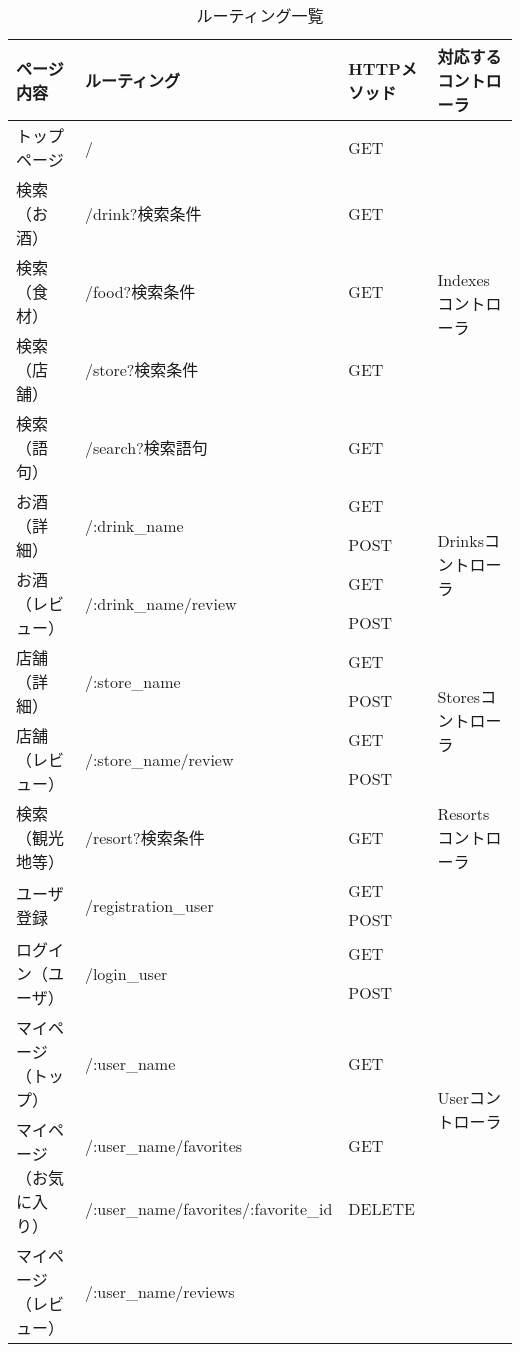 \documentclass[a4j,titlepage]{jarticle}
\begin{document}
\begin{description}
\begin{table}[!htbp]
\caption{ルーティング一覧}
\label{routing}
\small
\begin{center}
\begin{tabular}{|l|l|l|p{4cm}|}\hline
ページ内容 & ルーティング & HTTPメソッド & 対応するコントローラ\\\hline\hline
トップページ & / & GET & \multirow{5}{*}{Indexesコントローラ} \\\cline{1-3}
検索（お酒） & /drink?検索条件 & GET & \\\cline{1-3}
検索（食材） & /food?検索条件 & GET & \\\cline{1-3}
検索（店舗） & /store?検索条件 & GET &  \\\cline{1-3}
検索（語句） & /search?検索語句 & GET & \\\hline
\multirow{2}{*}{お酒（詳細）} & \multirow{2}{*}{/:drink\_name}
& GET & \multirow{4}{*}{Drinksコントローラ} \\\cline{3-3}
 & & POST &  \\\cline{1-3}
\multirow{2}{*}{お酒（レビュー）} & \multirow{2}{*}{/:drink\_name/review}
& GET & \\\cline{3-3}
 & & POST & \\\hline
\multirow{2}{*}{店舗（詳細）} & \multirow{2}{*}{/:store\_name}
& GET & \multirow{4}{*}{Storesコントローラ} \\\cline{3-3}
 & & POST &  \\\cline{1-3}
\multirow{2}{*}{店舗（レビュー）}& \multirow{2}{*}{/:store\_name/review}
& GET &  \\\cline{3-3}
 & & POST &\\\hline
検索（観光地等） & /resort?検索条件 & GET & Resortsコントローラ \\\hline
\multirow{2}{*}{ユーザ登録} & \multirow{2}{*}{/registration\_user}
& GET & \multirow{12}{*}{Userコントローラ} \\\cline{3-3}
 & & POST & \\\cline{1-3}
 \multirow{2}{*}{ログイン（ユーザ）} & \multirow{2}{*}{/login\_user}
 & GET & \\\cline{3-3}
 & & POST & \\\cline{1-3}
マイページ（トップ） & /:user\_name
& GET & \\\cline{1-3}
\multirow{2}{*}{マイページ（お気に入り）} & /:user\_name/favorites
& GET & \\\cline{2-3}
 & /:user\_name/favorites/:favorite\_id & DELETE & \\\cline{1-3}
\multirow{2}{*}{マイページ（レビュー）} & /:user\_name/reviews

\end{tabular}
\end{center}
\end{table}
\end{description}
\end{document}
